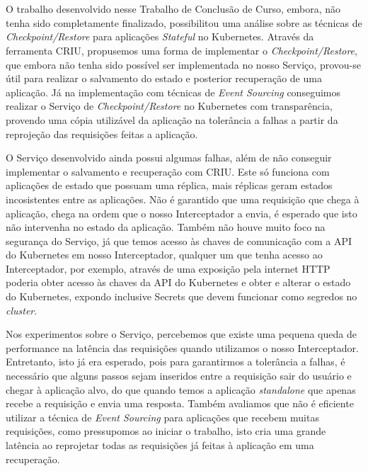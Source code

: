 

\chapter{}

	O trabalho desenvolvido nesse Trabalho de Conclusão de Curso, embora, não 
	tenha sido completamente finalizado, possibilitou uma análise sobre as técnicas
	de \textit{Checkpoint/Restore} para aplicações \textit{Stateful} no Kubernetes.
	Através da ferramenta CRIU, propusemos uma forma de implementar o
	\textit{Checkpoint/Restore}, que embora não tenha sido possível ser implementada
	no nosso Serviço, provou-se útil para realizar o salvamento do estado e posterior
	recuperação de uma aplicação. Já na implementação com técnicas de
	\textit{Event Sourcing} conseguimos realizar o Serviço de \textit{Checkpoint/Restore}
	no Kubernetes com transparência, provendo uma cópia utilizável da aplicação na
	tolerância a falhas a partir da reprojeção das requisições feitas a aplicação.
	
	O Serviço desenvolvido ainda possui algumas falhas, além de não conseguir
	implementar	o salvamento e recuperação com CRIU. Este só funciona com aplicações
	de estado que possuam uma réplica, mais réplicas geram estados incosistentes
	entre as aplicações. Não é garantido que uma requisição que chega à aplicação,
	chega na ordem que o nosso Interceptador a envia, é esperado que isto não
	intervenha no estado da aplicação. Também não houve muito foco na segurança do
	Serviço, já que temos acesso às chaves de comunicação com a API do Kubernetes
	em nosso Interceptador, qualquer um que tenha acesso ao Interceptador, por
	exemplo, através de uma exposição pela internet HTTP poderia obter acesso às
	chaves da API do Kubernetes e obter e alterar o estado do Kubernetes, expondo
	inclusive Secrets que devem funcionar como segredos no \textit{cluster}.
	
	Nos experimentos sobre o Serviço, percebemos que existe uma pequena queda de
	performance na latência das requisições quando utilizamos o nosso Interceptador.
	Entretanto, isto já era esperado, pois para garantirmos a tolerância a falhas, é
	necessário que alguns passos sejam inseridos entre a requisição sair do usuário e
	chegar à aplicação alvo, do que quando temos a aplicação \textit{standalone} que
	apenas recebe a requisição e envia uma resposta. Também avaliamos que não é
	eficiente utilizar a técnica de \textit{Event Sourcing} para aplicações que
	recebem muitas requisições, como pressupomos ao iniciar o trabalho, isto cria uma
	grande latência ao reprojetar todas as requisições já feitas à aplicação em uma
	recuperação.
	
